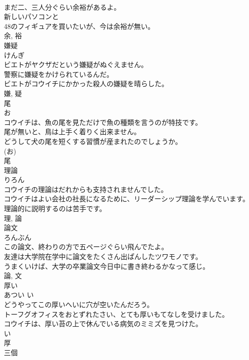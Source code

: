\documentclass[8pt]{extreport}
\begin{document}
\begin{CJK}{UTF8}{min}
\\	まだ二、三人分ぐらい余裕があるよ。	
\\	新しいパソコンと
\\	48のフィギュアを買いたいが、今は余裕が無い。	
\\	余, 裕	
\\	嫌疑	
\\	けんぎ	
\\	ビエトがヤクザだという嫌疑がぬぐえません。	
\\	警察に嫌疑をかけられているんだ。	
\\	ビエトがコウイチにかかった殺人の嫌疑を晴らした。	
\\	嫌, 疑	
\\	尾	
\\	お	
\\	コウイチは、魚の尾を見ただけで魚の種類を言うのが特技です。	
\\	尾が無いと、鳥は上手く着りく出来ません。	
\\	どうして犬の尾を短くする習慣が産まれたのでしょうか。	
\\	(お) 
\\	尾	
\\	理論	
\\	りろん	
\\	コウイチの理論はだれからも支持されませんでした。	
\\	コウイチはよい会社の社長になるために、リーダーシップ理論を学んでいます。	
\\	理論的に説明するのは苦手です。	
\\	理, 論	
\\	論文	
\\	ろんぶん	
\\	この論文、終わりの方で五ページぐらい飛んでたよ。	
\\	友達は大学院在学中に論文をたくさん出ぱんしたツワモノです。	
\\	うまくいけば、大学の卒業論文今日中に書き終わるかなって感じ。	
\\	論, 文	
\\	厚い	
\\	あつい	い 
\\	どうやってこの厚いへいに穴が空いたんだろう。	
\\	トーフグオフィスをおとずれたさい、とても厚いもてなしを受けました。	
\\	コウイチは、厚い苔の上で休んでいる病気のミミズを見つけた。	
\\	い 
\\	厚	
\\	三個	

\end{CJK}
\end{document}
